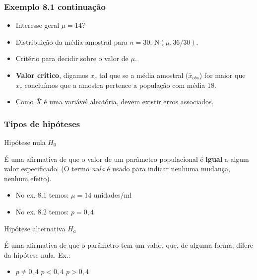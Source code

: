 \documentclass{beamer}
\begin{document}
\begin{frame}
\frametitle{Exemplo 8.1 continuação}

\begin{itemize}
\item
  Interesse geral \(\mu = 14\)?
\item
  Distribuição da média amostral para \(n = 30\):
  \(\text{N}(\mu, 36/30)\).
\item
  Critério para decidir sobre o valor de \(\mu\).
\item
  \textbf{Valor crítico}, digamos \(x_c\) tal que se a média amostral
  (\(\bar{x}_{obs}\)) for maior que \(x_c\) concluímos que a amostra
  pertence a população com média \(18\).
\item
  Como \(\bar{X}\) é uma variável aleatória, devem existir erros
  associados.
\end{itemize}
\end{frame}

\begin{frame}
\frametitle{Tipos de hipóteses}

\begin{block}{Hipótese nula \(H_0\)}

É uma afirmativa de que o valor de um parâmetro populacional é
\textbf{igual} a algum valor especificado. (O termo \emph{nula} é usado
para indicar nenhuma mudança, nenhum efeito).

\begin{itemize}
\item
  No ex. 8.1 temos: \(\mu = 14\) unidades/ml
\item
  No ex. 8.2 temos: \(p = 0,4\)
\end{itemize}
\end{block}

\begin{block}{Hipótese alternativa \(H_a\)}

É uma afirmativa de que o parâmetro tem um valor, que, de alguma forma,
difere da hipótese nula. Ex.:

\begin{itemize}
\item
  \(p \neq 0,4\) \qquad \(p < 0,4\) \qquad \(p > 0,4\)
\end{itemize}
\end{block}
\end{frame}
\end{document}
